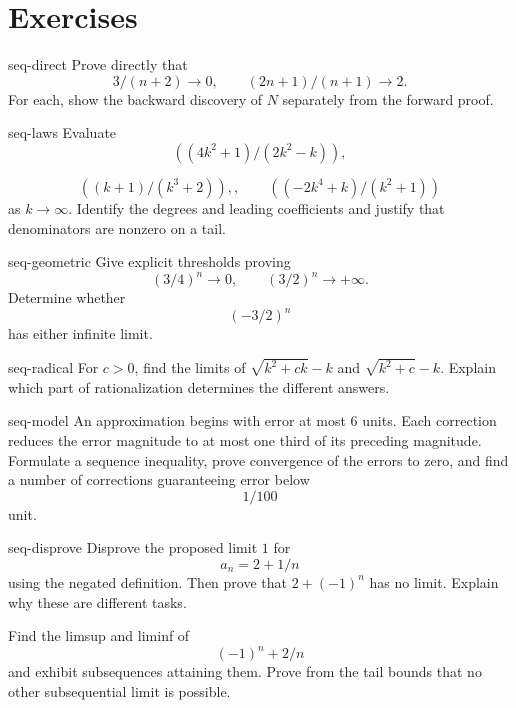 \section*{Exercises}

\begin{hexercise}{seq-direct}
Prove directly that
\[
3/(n+2)\to0,\qquad (2n+1)/(n+1)\to2.
\]
 For each, show the backward discovery of $N$ separately from the forward proof.
\end{hexercise}

\begin{hexercise}{seq-laws}
Evaluate
\[
((4k^2+1)/(2k^2-k)),
\]

\[
((k+1)/(k^3+2)),,\qquad ((-2k^4+k)/(k^2+1))
\]
 as $k\to\infty$. Identify the degrees and leading coefficients and justify that denominators are nonzero on a tail.
\end{hexercise}

\begin{hexercise}{seq-geometric}
Give explicit thresholds proving
\[
(3/4)^n\to0,\qquad (3/2)^n\to+\infty.
\]
 Determine whether
\[
(-3/2)^n
\]
 has either infinite limit.
\end{hexercise}

\begin{hexercise}{seq-radical}
For $c>0$, find the limits of $\sqrt{k^2+ck}-k$ and $\sqrt{k^2+c}-k$. Explain which part of rationalization determines the different answers.
\end{hexercise}

\begin{hexercise}{seq-model}
An approximation begins with error at most $6$ units. Each correction reduces the error magnitude to at most one third of its preceding magnitude. Formulate a sequence inequality, prove convergence of the errors to zero, and find a number of corrections guaranteeing error below
\[
1/100
\]
 unit.
\end{hexercise}

\begin{hexercise}{seq-disprove}
Disprove the proposed limit $1$ for
\[
a_n=2+1/n
\]
 using the negated definition. Then prove that $2+(-1)^n$ has no limit. Explain why these are different tasks.
\end{hexercise}

\begin{exercise}
Find the limsup and liminf of
\[
(-1)^n+2/n
\]
 and exhibit subsequences attaining them. Prove from the tail bounds that no other subsequential limit is possible.
\end{exercise}

